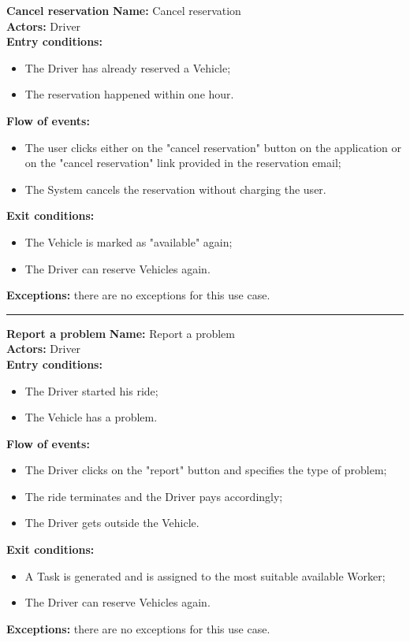 \textbf{\large Cancel reservation}
\bigbreak
\textbf{Name:} Cancel reservation\\
\textbf{Actors:} Driver \\
\textbf{Entry conditions:} 
\begin{itemize}
\item The Driver has already reserved a Vehicle;
\item The reservation happened within one hour.
\end{itemize}
\textbf{Flow of events:} 
\begin{itemize}
\item The user clicks either on the "cancel reservation" button on the application or on the "cancel reservation" link provided in the reservation email;
\item The System cancels the reservation without charging the user.
\end{itemize}
\textbf{Exit conditions:} 
\begin{itemize}
\item The Vehicle is marked as "available" again;
\item The Driver can reserve Vehicles again.
\end{itemize}
\textbf{Exceptions:} there are no exceptions for this use case.\\


\begin{center}
\noindent\rule{8cm}{1.0pt}
\end{center}


\textbf{\large Report a problem}
\bigbreak
\textbf{Name:} Report a problem\\
\textbf{Actors:} Driver \\
\textbf{Entry conditions:} 
\begin{itemize}
\item The Driver started his ride;
\item The Vehicle has a problem.
\end{itemize}
\textbf{Flow of events:} 
\begin{itemize}
\item The Driver clicks on the "report" button and specifies the type of problem; 
\item The ride terminates and the Driver pays accordingly;
\item The Driver gets outside the Vehicle.
\end{itemize}
\textbf{Exit conditions:} 
\begin{itemize}
\item A Task is generated and is assigned to the most suitable available Worker;
\item The Driver can reserve Vehicles again.
\end{itemize}
\textbf{Exceptions:} there are no exceptions for this use case.\\



